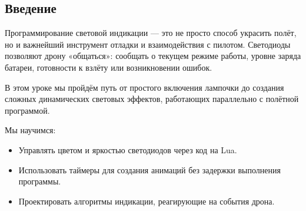 \subsection{Введение}

Программирование световой индикации — это не просто способ украсить полёт, но и важнейший инструмент отладки и взаимодействия с пилотом. Светодиоды позволяют дрону «общаться»: сообщать о текущем режиме работы, уровне заряда батареи, готовности к взлёту или возникновении ошибок.

В этом уроке мы пройдём путь от простого включения лампочки до создания сложных динамических световых эффектов, работающих параллельно с полётной программой.

\begin{infobox}
Мы научимся:
\begin{itemize}
    \item Управлять цветом и яркостью светодиодов через код на Lua.
    \item Использовать таймеры для создания анимаций без задержки выполнения программы.
    \item Проектировать алгоритмы индикации, реагирующие на события дрона.
\end{itemize}
\end{infobox}
